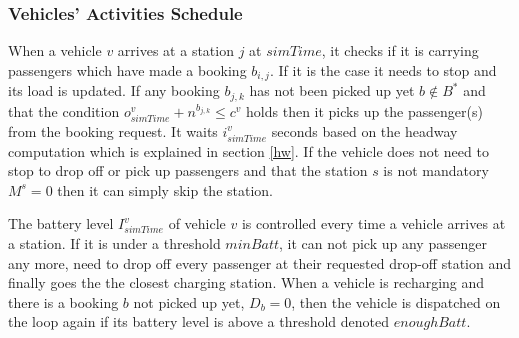 \documentclass[12pt,a4paper]{article}
\begin{document}
\subsubsection{Vehicles' Activities Schedule}\label{schedule}
When a vehicle $v$ arrives at a station $j$ at $simTime$, it checks if it is carrying passengers which have made a booking $b_{i,j}$. If it is the case it needs to stop and its load is updated. If any booking $b_{j,k}$ has not been picked up yet $b \not\in B^{*}$ and that the condition $o^{v}_{simTime} + n^{b_{j,k}} \leq c^{v}$ holds then it picks up the passenger(s) from the booking request. It waits $i^{v}_{simTime}$ seconds based on the headway computation which is explained in section \ref{hw}. If the vehicle does not need to stop to drop off or pick up passengers and that the station $s$ is not mandatory $M^{s} = 0$ then it can simply skip the station.   

The battery level $I^{v}_{simTime}$ of vehicle $v$ is controlled every time a vehicle arrives at a station. If it is under a threshold $minBatt$, it can not pick up any passenger any more, need to drop off every passenger at their requested drop-off station and finally goes the the closest charging station. When a vehicle is recharging and there is a booking $b$ not picked up yet, $D_{b} = 0$, then the vehicle is dispatched on the loop again if its battery level is above a threshold denoted $enoughBatt$. 
\end{document}
